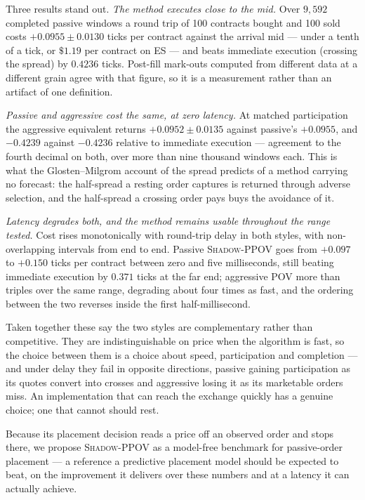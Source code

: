 \documentclass[11pt]{article}
\newcommand{\pov}{\textsc{Shadow-PPOV}}
\begin{document}
Three results stand out. \emph{The method executes close to the mid.} Over
$9{,}592$ completed passive windows a round trip of 100 contracts bought and 100
sold costs $+0.0955 \pm 0.0130$ ticks per contract against the arrival mid --- under
a tenth of a tick, or $\$1.19$ per contract on ES --- and beats immediate
execution (crossing the spread) by $0.4236$ ticks. 
Post-fill mark-outs computed from different data at
a different grain agree with that figure, so it is a measurement rather than an
artifact of one definition.

\emph{Passive and aggressive cost the same, at zero latency.} At matched
participation the aggressive equivalent returns $+0.0952 \pm 0.0135$ against
passive's $+0.0955$, and $-0.4239$ against $-0.4236$ relative to immediate
execution --- agreement to the fourth decimal on both, over more than nine
thousand windows each. This is what the Glosten--Milgrom account of the spread
predicts of a method carrying no forecast: the half-spread a resting order
captures is returned through adverse selection, and the half-spread a crossing
order pays buys the avoidance of it.

\emph{Latency degrades both, and the method remains usable throughout the range
tested.} Cost rises monotonically with round-trip delay in both styles, with
non-overlapping intervals from end to end. Passive \pov{} goes from $+0.097$ to
$+0.150$ ticks per contract between zero and five milliseconds, still beating
immediate execution by $0.371$ ticks at the far end; aggressive POV more than
triples over the same range, degrading about four times as fast, and the
ordering between the two reverses inside the first half-millisecond.

Taken together these say the two styles are complementary rather than
competitive. They are indistinguishable on price when the algorithm is fast, so
the choice between them is a choice about speed, participation and completion
--- and under delay they fail in opposite directions, passive gaining
participation as its quotes convert into crosses and aggressive losing it as its
marketable orders miss. An implementation that can reach the exchange quickly
has a genuine choice; one that cannot should rest.

Because its placement decision reads a price off an observed order and stops
there, we propose \pov{} as a model-free benchmark for passive-order
placement --- a reference a predictive placement model should be expected to
beat, on the improvement it delivers over these numbers and at a latency it can
actually achieve.
\end{document}
